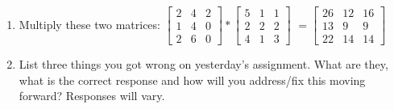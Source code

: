 \documentclass[11pt]{article}
\begin{document}
\begin{enumerate}
\begin{enumerate}
\item Multiply these two matrices: $
\begin{bmatrix}
   2 & 4 & 2 \\
    1 & 4 & 0 \\
    2 & 6 & 0
\end{bmatrix}
*
\begin{bmatrix}
5 & 1 & 1 \\
2 & 2 & 2 \\
4 & 1 & 3
\end{bmatrix}
$
{\color{gray} $=\begin{bmatrix}
26 & 12 & 16 \\
13 & 9 & 9\\
22 & 14 & 14
\end{bmatrix}
$}

\item  List three things you got wrong on yesterday's assignment. What are they, what is the correct response and how will you address/fix this moving forward? \color{gray} Responses will vary. \color{black}
\end{enumerate}

\begin{comment}
\item Introduction to differentiation
\begin{enumerate}
\item What is a derivative? Why might we find it useful? \color{gray} A derivative enables us to do many different things, primarily understand rates of change at particular points and patterns of change overall. It also enables us to find maxima and minima. \color{black}

\item Give an example of a derivative we might care about (think about the education and salary graphs from lecture) \color{gray} Many examples work: Arrival/exit in the workforce and national GDP, disease rates, vaccination rates, just about anything that you can look at over time. \color{black}

\item If $f(x) = x^2$ and $g(x)= 3x + 9$, write $z(x) = f(g(x))$ and simplify (i.e. expand). \color{gray} $z(x)=(3x+9)^2=9x^2+54x+81$ \color{black}

\item Compute manually, using the formula for a derivative (i.e. $ lim_{h\rightarrow0}\frac{f(x+h)-f(x)}{h}$), the derivative of $x^3$. \color{gray} $lim_{h\rightarrow0}\frac{(x+h)^3-x^3}{h}=lim_{h\rightarrow0}\frac{x^3+3x^2h+3xh^2+h^3-x^3}{h}=lim_{h\rightarrow0}\frac{3x^2h+3xh^2+h^3}{h}=lim_{h\rightarrow0}3x^2+3xh+h^2=3x^2$ \color{black}


\item Find the derivative of $f(x) = 2x^2 + 7x + 9$. \color{gray} $f'(x)=4x+7$ \color{black}

\item Find the derivative of $f(x) = 3x^2$ \color{gray} $f'(x)=6x$ \color{black}
\end{enumerate}



\end{comment}
\end{enumerate}
\end{document}
